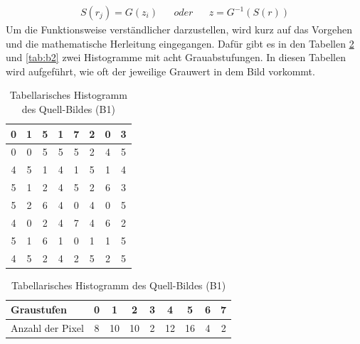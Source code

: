\begin{align} S(r_{j})=G(z_{i})& &oder& & z=G^{-1}(S(r)) \end{align} 
Um die Funktionsweise verständlicher darzustellen, wird kurz auf das Vorgehen und die mathematische Herleitung eingegangen. Dafür gibt es in den Tabellen \ref{tab:b1} und \ref{tab:b2} zwei Histogramme mit acht Grauabstufungen. In diesen Tabellen wird aufgeführt, wie oft der jeweilige Grauwert in dem Bild vorkommt. 
  \begin{table}[htb]
  \caption{Tabellarisches Histogramm des Quell-Bildes (B1)}
  \label{tab:b1}
  \centering
  \begin{minipage}{\textwidth}
  \center
  \begin{tabular}{|c|c|c|c|c|c|c|c|}
  \hline
  0&1&5&1&7&2&0&3\\
  \hline
  0&0&5&5&5&2&4&5\\
  \hline
  4&5&1&4&1&5&1&4\\
  \hline
  5&1&2&4&5&2&6&3\\
  \hline
  5&2&6&4&0&4&0&5\\
  \hline
  4&0&2&4&7&4&6&2\\
  \hline
  5&1&6&1&0&1&1&5\\
  \hline
  4&5&2&4&2&5&2&5\\
  \hline
  \end{tabular}
  \end{minipage}
  \begin{minipage}{\textwidth}
  \hspace{\textwidth}
  \end{minipage}
  \begin{minipage}{\textwidth}
  \center
  \begin{tabular}{|l|c|c|c|c|c|c|c|c|}
  \hline
  Graustufen & 0 & 1 & 2 & 3 & 4 & 5 & 6 & 7\\
  \hline
  Anzahl der Pixel & 8 & 10 & 10 & 2 & 12 & 16 & 4 & 2\\
  \hline
  \end{tabular}
  \end{minipage}
  \vspace{-1 cm}
  \end{table}
